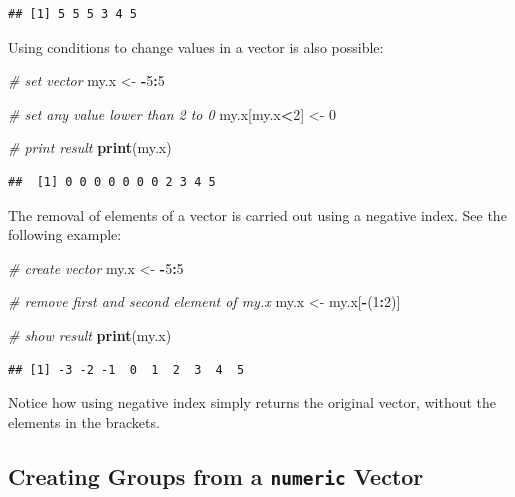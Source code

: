 \documentclass[11pt,]{book}
\newenvironment{Shaded}{\begin{snugshade}}{\end{snugshade}}
\newcommand{\KeywordTok}[1]{\textcolor[rgb]{0.27,0.27,0.27}{\textbf{#1}}}
\newcommand{\DecValTok}[1]{\textcolor[rgb]{0.06,0.06,0.06}{#1}}
\newcommand{\StringTok}[1]{\textcolor[rgb]{0.5,0.5,0.5}{#1}}
\newcommand{\CommentTok}[1]{\textcolor[rgb]{0.56,0.35,0.01}{\textit{#1}}}
\newcommand{\OperatorTok}[1]{\textcolor[rgb]{0.81,0.36,0.00}{\textbf{#1}}}
\newcommand{\NormalTok}[1]{#1}
\begin{document}
\begin{verbatim}
## [1] 5 5 5 3 4 5
\end{verbatim}

Using conditions to change values in a vector is also possible:

\begin{Shaded}
\begin{Highlighting}[]
\CommentTok{# set vector }
\NormalTok{my.x <-}\StringTok{ }\OperatorTok{-}\DecValTok{5}\OperatorTok{:}\DecValTok{5}

\CommentTok{# set any value lower than 2 to 0}
\NormalTok{my.x[my.x}\OperatorTok{<}\DecValTok{2}\NormalTok{] <-}\StringTok{ }\DecValTok{0}

\CommentTok{# print result}
\KeywordTok{print}\NormalTok{(my.x)}
\end{Highlighting}
\end{Shaded}

\begin{verbatim}
##  [1] 0 0 0 0 0 0 0 2 3 4 5
\end{verbatim}

The removal of elements of a vector is carried out using a negative
index. See the following example:

\begin{Shaded}
\begin{Highlighting}[]
\CommentTok{# create vector}
\NormalTok{my.x <-}\StringTok{ }\OperatorTok{-}\DecValTok{5}\OperatorTok{:}\DecValTok{5}

\CommentTok{# remove first and second element of my.x}
\NormalTok{my.x <-}\StringTok{ }\NormalTok{my.x[}\OperatorTok{-}\NormalTok{(}\DecValTok{1}\OperatorTok{:}\DecValTok{2}\NormalTok{)]}

\CommentTok{# show result}
\KeywordTok{print}\NormalTok{(my.x)}
\end{Highlighting}
\end{Shaded}

\begin{verbatim}
## [1] -3 -2 -1  0  1  2  3  4  5
\end{verbatim}

Notice how using negative index simply returns the original vector,
without the elements in the brackets.

\subsection{\texorpdfstring{Creating Groups from a \texttt{numeric}
Vector}{Creating Groups from a numeric Vector}}\label{creating-groups-from-a-numeric-vector}
\end{document}
